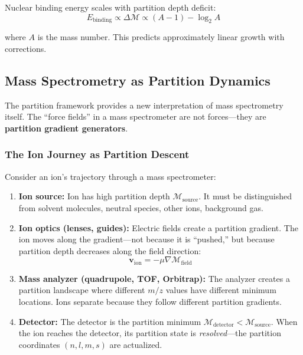 \documentclass[twocolumn,10pt,a4paper]{article}
\theoremstyle{definition}
\theoremstyle{remark}
\newcommand{\Depth}{\mathcal{M}}
\begin{document}
Nuclear binding energy scales with partition depth deficit:
\begin{equation}
    E_{\text{binding}} \propto \Delta\Depth \propto (A-1) - \log_2 A
\end{equation}

where $A$ is the mass number. This predicts approximately linear growth with corrections.

\subsection{Mass Spectrometry as Partition Dynamics}

The partition framework provides a new interpretation of mass spectrometry itself. The ``force fields'' in a mass spectrometer are not forces---they are \textbf{partition gradient generators}.

\subsubsection{The Ion Journey as Partition Descent}

Consider an ion's trajectory through a mass spectrometer:

\begin{enumerate}
    \item \textbf{Ion source:} Ion has high partition depth $\Depth_{\text{source}}$. It must be distinguished from solvent molecules, neutral species, other ions, background gas.

    \item \textbf{Ion optics (lenses, guides):} Electric fields create a partition gradient. The ion moves along the gradient---not because it is ``pushed,'' but because partition depth decreases along the field direction:
    \begin{equation}
        \mathbf{v}_{\text{ion}} = -\mu \nabla \Depth_{\text{field}}
    \end{equation}

    \item \textbf{Mass analyzer (quadrupole, TOF, Orbitrap):} The analyzer creates a partition landscape where different $m/z$ values have different minimum locations. Ions separate because they follow different partition gradients.

    \item \textbf{Detector:} The detector is the partition minimum $\Depth_{\text{detector}} < \Depth_{\text{source}}$. When the ion reaches the detector, its partition state is \emph{resolved}---the partition coordinates $(n, l, m, s)$ are actualized.
\end{enumerate}
\end{document}
